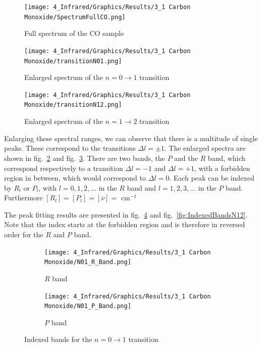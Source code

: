 \documentclass[12pt]{article}
\begin{document}
\begin{figure}[!ht]
    \centering
    \texttt{[image: 4\_Infrared/Graphics/Results/3\_1 Carbon Monoxide/SpectrumFullCO.png]}
    \caption{Full spectrum of the CO sample}
    \label{fig:SpectrumFullCO}
\end{figure}
\FloatBarrier

\begin{figure}[!ht]
    \centering
    \texttt{[image: 4\_Infrared/Graphics/Results/3\_1 Carbon Monoxide/transitionN01.png]}
    \caption{Enlarged spectrum of the $n = 0 \rightarrow 1$ transition}
    \label{fig:SpectrumEnlargedN01}
\end{figure}
\FloatBarrier

\begin{figure}[!ht]
    \centering
    \texttt{[image: 4\_Infrared/Graphics/Results/3\_1 Carbon Monoxide/transitionN12.png]}
    \caption{Enlarged spectrum of the $n = 1 \rightarrow 2$ transition}
    \label{fig:SpectrumEnlargedN12}
\end{figure}
\FloatBarrier

Enlarging these spectral ranges, we can observe that there is a multitude of single peaks. These correspond to the transitions $\Delta l = \pm 1$. The enlarged spectra are shown in fig.~\ref{fig:SpectrumEnlargedN01} and fig.~\ref{fig:SpectrumEnlargedN12}. There are two bands, the $P$ and the $R$ band, which correspond respectively to a transition $\Delta l = -1$ and $\Delta l = +1$, with a forbidden region in between, which would correspond to $\Delta l = 0$. Each peak can be indexed by $R_l$ or $P_l$, with $l=0,1,2,\dots$ in the $R$ band and $l = 1,2,3, \dots$ in the $P$ band. Furthermore $[R_l] = [P_l] = [\overline{\nu}] =$ cm$^{-1}$

The peak fitting results are presented in fig.~\ref{fig:IndexedBandsN01} and fig.~\ref{fig:IndexedBandsN12}. Note that the index starts at the forbidden region and is therefore in reversed order for the $R$ and $P$ band.
\begin{figure}[!ht]
    \centering
    \begin{subfigure}[c]{0.49\textwidth}
        \centering
        \texttt{[image: 4\_Infrared/Graphics/Results/3\_1 Carbon Monoxide/N01\_R\_Band.png]}
        \caption{$R$ band}
    \end{subfigure}
    \hfill
    \begin{subfigure}[c]{0.49\textwidth}
        \centering
        \texttt{[image: 4\_Infrared/Graphics/Results/3\_1 Carbon Monoxide/N01\_P\_Band.png]}
        \caption{$P$ band}
    \end{subfigure}
    \caption{Indexed bands for the $n = 0 \rightarrow 1$ transition}
    \label{fig:IndexedBandsN01}
\end{figure}
\FloatBarrier
\end{document}
